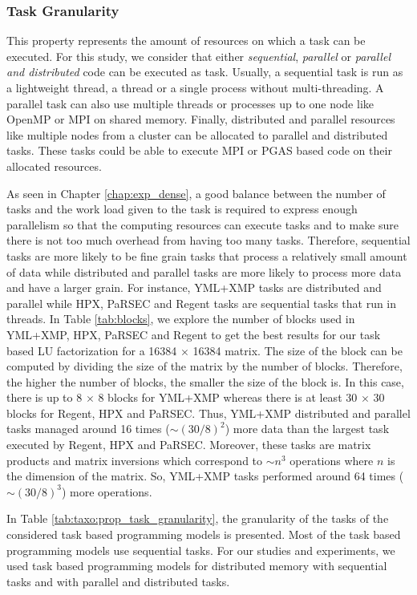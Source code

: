 \subsubsection{Task Granularity}
This property represents the amount of resources on which a task can be executed.
For this study, we consider that either \textit{sequential}, \textit{parallel} or \textit{parallel and distributed} code can be executed as task.
Usually, a sequential task is run as a lightweight thread, a thread or a single process without multi-threading.
A parallel task can also use multiple threads or processes up to one node like OpenMP or MPI on shared memory.
Finally, distributed and parallel resources like multiple nodes from a cluster can be allocated to parallel and distributed tasks.
These tasks could be able to execute MPI or PGAS based code on their allocated resources.

As seen in Chapter \ref{chap:exp_dense}, a good balance between the number of tasks and the work load given to the task is required to express enough parallelism so that the computing resources can execute tasks and to make sure there is not too much overhead from having too many tasks.
Therefore, sequential tasks are more likely to be fine grain tasks that process a relatively small amount of data while distributed and parallel tasks are more likely to process more data and have a larger grain.
For instance, YML+XMP tasks are distributed and parallel while HPX, PaRSEC and Regent tasks are sequential tasks that run in threads.
In Table \ref{tab:blocks}, we explore the number of blocks used in YML+XMP, HPX, PaRSEC and Regent to get the best results for our task based LU factorization for a 16384 $\times$ 16384 matrix.
The size of the block can be computed by dividing the size of the matrix by the number of blocks.
Therefore, the higher the number of blocks, the smaller the size of the block is.
In this case, there is up to 8 $\times$ 8 blocks for YML+XMP whereas there is at least 30 $\times$ 30 blocks for Regent, HPX and PaRSEC.
Thus, YML+XMP distributed and parallel tasks managed around 16 times ($ \sim (30/8)^2 $) more data than the largest task executed by Regent, HPX and PaRSEC.
Moreover, these tasks are matrix products and matrix inversions which correspond to $\sim n^3$ operations where $n$ is the dimension of the matrix.
So, YML+XMP tasks performed around 64 times ($ \sim (30/8)^3 $) more operations.

In Table \ref{tab:taxo:prop_task_granularity}, the granularity of the tasks of the considered task based programming models is presented.
Most of the task based programming models use sequential tasks.
For our studies and experiments, we used task based programming models for distributed memory with sequential tasks and with parallel and distributed tasks.

